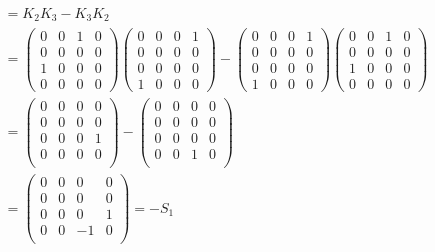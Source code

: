 \documentclass[11pt]{article}
\begin{document}
\begin{gather*}
    [K_{2}, K_{3}] = K_{2}K_{3} - K_{3}K_{2} \\
    =
\left(\begin{array}{llll}
0 & 0 & 1 & 0 \\
0 & 0 & 0 & 0 \\
1 & 0 & 0 & 0 \\
0 & 0 & 0 & 0
\end{array}\right)
\left(\begin{array}{llll}
0 & 0 & 0 & 1 \\
0 & 0 & 0 & 0 \\
0 & 0 & 0 & 0 \\
1 & 0 & 0 & 0
\end{array}\right)
    -
\left(\begin{array}{llll}
0 & 0 & 0 & 1 \\
0 & 0 & 0 & 0 \\
0 & 0 & 0 & 0 \\
1 & 0 & 0 & 0
\end{array}\right)
\left(\begin{array}{llll}
0 & 0 & 1 & 0 \\
0 & 0 & 0 & 0 \\
1 & 0 & 0 & 0 \\
0 & 0 & 0 & 0
\end{array}\right) \\
    =
    \begin{pmatrix}
    0 & 0 & 0 & 0 \\
    0 & 0 & 0 & 0 \\
    0 & 0 & 0 & 1 \\
    0 & 0 & 0 & 0 \\
    \end{pmatrix}
    -
    \begin{pmatrix}
    0 & 0 & 0 & 0 \\
    0 & 0 & 0 & 0 \\
    0 & 0 & 0 & 0 \\
    0 & 0 & 1 & 0 \\
    \end{pmatrix} \\
    =
    \begin{pmatrix}
    0 & 0 & 0 & 0 \\
    0 & 0 & 0 & 0 \\
    0 & 0 & 0 & 1 \\
    0 & 0 & -1 & 0 \\
    \end{pmatrix} = -S_{1}
\end{gather*}
\end{document}
